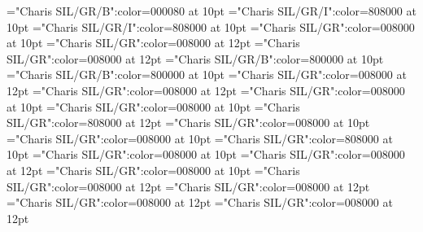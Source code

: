 \documentclass[a4paper,twoside]{article}
\begin{document}
\font\spanmxbcaptioncaptionContentpictureentryletDatadicBody="Charis SIL/GR/B":color=000080 at 10pt
\font\comentariorestrictivosensesensecontentsensesentryletDatadicBody="Charis SIL/GR/I":color=808000 at 10pt
\font\spancomentariorestrictivosensesensecontentsensesentryletDatadicBody="Charis SIL/GR/I":color=808000 at 10pt
\font\spanescomentariorestrictivosensesensecontentsensesentryletDatadicBody="Charis SIL/GR":color=008000 at 10pt
\font\sensessensesensecontentsensesentryletDatadicBody="Charis SIL/GR":color=008000 at 12pt
\font\sensecontentsensessensesensecontentsensesentryletDatadicBody="Charis SIL/GR":color=008000 at 12pt
\font\sensenumbersensecontentsensessensesensecontentsensesentryletDatadicBody="Charis SIL/GR/B":color=800000 at 10pt
\font\spansensenumbersensecontentsensessensesensecontentsensesentryletDatadicBody="Charis SIL/GR/B":color=800000 at 10pt
\font\sensesensecontentsensessensesensecontentsensesentryletDatadicBody="Charis SIL/GR":color=008000 at 12pt
\font{}="Charis SIL/GR":color=008000 at 12pt
\font\spanesdefinitionorglosssensesensecontentsensessensesensecontentsensesentryletDatadicBody="Charis SIL/GR":color=008000 at 10pt
\font\spandefinitionorglosssensesensecontentsensessensesensecontentsensesentryletDatadicBody="Charis SIL/GR":color=008000 at 10pt
\font\restrictionssensesensecontentsensessensesensecontentsensesentryletDatadicBody="Charis SIL/GR":color=808000 at 12pt
\font\spanesrestrictionssensesensecontentsensessensesensecontentsensesentryletDatadicBody="Charis SIL/GR":color=008000 at 10pt
\font\spanspanesrestrictionssensesensecontentsensessensesensecontentsensesentryletDatadicBody="Charis SIL/GR":color=008000 at 10pt
\font\spanrestrictionssensesensecontentsensessensesensecontentsensesentryletDatadicBody="Charis SIL/GR":color=808000 at 10pt
\font\spansensecontentsensessensesensecontentsensesentryletDatadicBody="Charis SIL/GR":color=008000 at 10pt
\font\variantformentrybackrefsentryletDatadicBody="Charis SIL/GR":color=008000 at 12pt
\font\spanvariantformentrybackrefsentryletDatadicBody="Charis SIL/GR":color=008000 at 10pt
\font\variantformentrybackrefvariantformentrybackrefsentryletDatadicBody="Charis SIL/GR":color=008000 at 12pt
\font\variantentrytypesvariantformentrybackrefvariantformentrybackrefsentryletDatadicBody="Charis SIL/GR":color=008000 at 12pt
\font\variantentrytypevariantentrytypesvariantformentrybackrefvariantformentrybackrefsentryletDatadicBody="Charis SIL/GR":color=008000 at 12pt
\font\abbreviationvariantentrytypevariantentrytypesvariantformentrybackrefvariantformentrybackrefsentryletDatadicBody="Charis SIL/GR":color=008000 at 12pt
\end{document}
